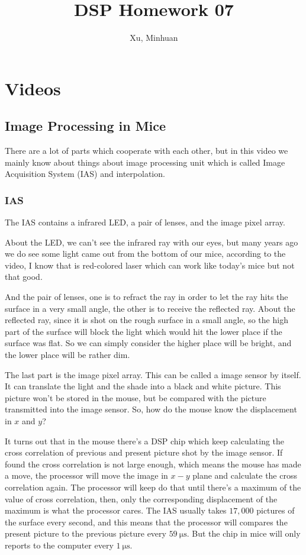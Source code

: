 \documentclass{article}
\begin{document}
\title{DSP Homework 07}
\author{Xu, Minhuan}
\maketitle
\tableofcontents
\begin{abstract}

\end{abstract}

\section{Videos}
\subsection{Image Processing in Mice}
There are a lot of parts which cooperate with each other, but in this video we mainly know about things about image processing unit which is called Image Acquisition System (IAS) and interpolation.

\subsubsection{IAS}

The IAS contains a infrared LED, a pair of lenses, and the image pixel array. 

About the LED, we can't see the infrared ray with our eyes, but many years ago we do see some light came out from the bottom of our mice, according to the video, I know that is red-colored laser which can work like today's mice but not that good.

And the pair of lenses, one is to refract the ray in order to let the ray hits the surface in a very small angle, the other is to receive the reflected ray. About the reflected ray, since it is shot on the rough surface in a small angle, so the high part of the surface will block the light which would hit the lower place if the surface was flat. So we can simply consider the higher place will be bright, and the lower place will be rather dim.

The last part is the image pixel array. This can be called a image sensor by itself. It can translate the light and the shade into a black and white picture. This picture won't be stored in the mouse, but be compared with the picture transmitted into the image sensor. So, how do the mouse know the displacement in $x$ and $y$?

It turns out that in the mouse there's a DSP chip which keep calculating the cross correlation of previous and present picture shot by the image sensor. If found the cross correlation is not large enough, which means the mouse has made a move, the processor will move the image in $x-y$ plane and calculate the cross correlation again. The processor will keep do that until there's a maximum of the value of cross correlation, then, only the corresponding displacement of the maximum is what the processor cares. The IAS usually takes $17,000$ pictures of the surface every second, and this means that the processor will compares the present picture to the previous picture every $59 ~\mathrm{\mu s}$. But the chip in mice will only reports to the computer every $1 ~\mathrm{\mu s}$.
\end{document}
